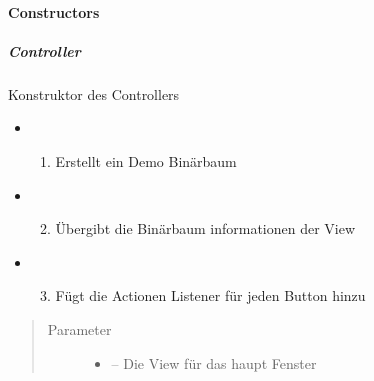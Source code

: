 \documentclass[letterpaper,10pt,ngerman]{sphinxmanual}
\begin{document}
\paragraph{Constructors}
\label{\detokenize{com/linuxluigi/edu/Controller:constructors}}

\subparagraph{Controller}
\label{\detokenize{com/linuxluigi/edu/Controller:id1}}

\begin{fulllineitems}
\label{\detokenize{com/linuxluigi/edu/Controller:com.linuxluigi.edu.Controller.Controller(View)}}
Konstruktor des Controllers
\begin{itemize}
\item {} \begin{enumerate}
\item {} 
Erstellt ein Demo Binärbaum

\end{enumerate}

\item {} \begin{enumerate}
\setcounter{enumi}{1}
\item {} 
Übergibt die Binärbaum informationen der View

\end{enumerate}

\item {} \begin{enumerate}
\setcounter{enumi}{2}
\item {} 
Fügt die Actionen Listener für jeden Button hinzu

\end{enumerate}

\end{itemize}
\begin{quote}\begin{description}
\item[{Parameter}] \leavevmode\begin{itemize}
\item {} 
 -- Die View für das haupt Fenster

\end{itemize}

\end{description}\end{quote}

\end{fulllineitems}
\end{document}
